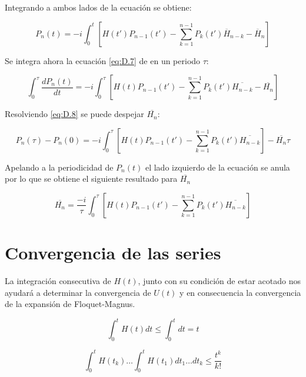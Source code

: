 Integrando a ambos lados de la ecuación se obtiene: 

\begin{equation}\label{eq:D.7}
    P_n(t)=-i\int^{t}_{0}\left[ H(t')P_{n-1}(t')-\sum^{n-1}_{k=1}P_k(t')\overline{H}_{n-k}-\overline{H}_n\right]
\end{equation}

Se integra ahora la ecuación \ref{eq:D.7} de en un periodo $\tau$:

\begin{equation}\label{eq:D.8}
    \int^{\tau}_{0}\frac{dP_n(t)}{dt}=-i\int^{\tau}_{0}\left[ H(t)P_{n-1}(t')-\sum^{n-1}_{k=1}P_k(t')\overline{H_{n-k}}-\overline{H_n}\right]
\end{equation}

Resolviendo \ref{eq:D.8} se puede despejar $\overline{H_n}$:

\begin{equation}\label{eq:D.9}
    P_n(\tau)-P_n(0)=-i\int^{\tau}_{0}\left[ H(t)P_{n-1}(t')-\sum^{n-1}_{k=1}P_k(t')\overline{H_{n-k}}\right]-\overline{H_n}\tau
\end{equation}

Apelando a la periodicidad de $P_n(t)$ el lado izquierdo de la ecuación se anula por lo que se obtiene el siguiente resultado para $\overline{H_n}$

\begin{equation}\label{eq:D.10}
    \overline{H_n}=\frac{-i}{\tau}\int^{\tau}_{0}\left[ H(t)P_{n-1}(t')-\sum^{n-1}_{k=1}P_k(t')\overline{H_{n-k}}\right]
\end{equation}

\section{Convergencia de las series}

La integración consecutiva de $H(t)$, junto con su condición de estar acotado nos ayudará a determinar la convergencia de $U(t)$ y en consecuencia la convergencia de la expansión de Floquet-Magnus.

\begin{equation}\label{eq:D.11}
   \int^{t}_0 H(t)dt \leq \int^{t}_0 dt = t
\end{equation}

\begin{equation}\label{eq:D.12}
    \int^{t}_0H(t_k)\dots \int^{t}_0H(t_1)dt_1 \dots dt_k \leq \frac{t^k}{k!}
\end{equation}

